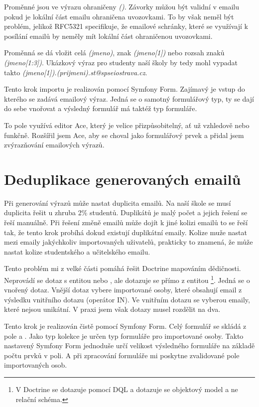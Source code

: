 Proměnné jsou ve výrazu ohraničeny \textit{()}. Závorky můžou být validní v emailu pokud je lokální část emailu ohraničena uvozovkami\cite{wiki-email-address}. To by však neměl být problém, jelikož RFC5321 specifikuje, že emailové schránky, které se využívají k posílání emailů by neměly mít lokální část ohraničenou uvozovkami\cite{rfc5321}.

Proměnná se dá vložit celá \textit{(jmeno)}, znak \textit{(jmeno[1])} nebo rozsah znaků \textit{(jmeno[1:3])}.
Ukázkový výraz pro studenty naší školy by tedy mohl vypadat takto \textit{(jmeno[1]).(prijmeni).st@spseiostrava.cz}.

Tento krok importu je realizován pomocí Symfony Form. Zajímavý je vstup do kterého se zadává emailový výraz. Jedná se o samotný formulářový typ, ty se dají do sebe vnořovat a výsledný formulář má taktéž typ formuláře. 

To pole využívá editor Ace, který je velice přizpůsobitelný, ať už vzhledově nebo funkčně. Rozšířil jsem Ace, aby se choval jako formulářový prvek a přidal jsem zvýrazňování emailových výrazů.

\section{Deduplikace generovaných emailů}

Při generování výrazů může nastat duplicita emailů.
Na naší škole se musí duplicita řešit u zhruba 2\% studentů.
Duplikátů je malý počet a jejich řešení se řeší manuálně.
Při řešení změně emailů může dojít k jiné kolizi emailů to se řeší tak, že tento krok probíhá dokud existují duplikátní emaily. Kolize muže nastat mezi emaily jakýchkoliv importovaných uživatelů, prakticky to znamená, že může nastat kolize studentského a učitelského emailu.

Tento problém mi z velké části pomáhá řešit Doctrine mapováním dědičnosti.
Neprovádí se dotaz s entitou  nebo , ale dotazuje se přímo z entitou \footnote{V Doctrine se dotazuje pomocí DQL a dotazuje se objektový model a ne relační schéma.}.
Jedná se o vnořený dotaz.
Vnější dotaz vybere importované osoby, které obsahují email z výsledku vnitřního dotazu (operátor \textsc{IN}).
Ve vnitřním dotazu se vyberou emaily, které nejsou unikátní. V praxi jsem však dotazy musel rozdělit na dva.

Tento krok je realizován čistě pomocí Symfony Form. Celý formulář se skládá z pole  a .
Jako typ kolekce je určen typ formuláře pro importované osoby. Takto nastavený Symfony Form jednoduše určí velikost výsledného formuláře na základě počtu prvků v poli. A při zpracování formuláře mi poskytne zvalidované pole importovaných osob.
